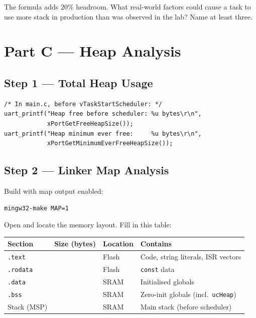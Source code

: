 \documentclass[11pt, a4paper]{article}
\begin{document}
\begin{questionbox}[~B2]
  The formula adds 20\% headroom. What real-world factors could cause a task to use more
  stack in production than was observed in the lab? Name at least three.
\end{questionbox}

\section{Part C --- Heap Analysis}

\subsection{Step 1 --- Total Heap Usage}

\begin{lstlisting}[style=cstyle]
/* In main.c, before vTaskStartScheduler: */
uart_printf("Heap free before scheduler: %u bytes\r\n",
            xPortGetFreeHeapSize());
uart_printf("Heap minimum ever free:     %u bytes\r\n",
            xPortGetMinimumEverFreeHeapSize());
\end{lstlisting}

\subsection{Step 2 --- Linker Map Analysis}

Build with map output enabled:

\begin{lstlisting}[style=bashstyle]
mingw32-make MAP=1
\end{lstlisting}

Open  and locate the memory layout. Fill in this table:

\renewcommand{\arraystretch}{1.3}
\begin{tabular}{@{} p{2.5cm} p{2cm} p{1.8cm} p{5.5cm} @{}}
  \toprule
  \textbf{Section} & \textbf{Size (bytes)} & \textbf{Location} & \textbf{Contains} \\
  \midrule
  \texttt{.text}       & & Flash & Code, string literals, ISR vectors \\
  \texttt{.rodata}     & & Flash & \texttt{const} data \\
  \texttt{.data}       & & SRAM  & Initialised globals \\
  \texttt{.bss}        & & SRAM  & Zero-init globals (incl.\ \texttt{ucHeap}) \\
  Stack (MSP)          & & SRAM  & Main stack (before scheduler) \\
  \bottomrule
\end{tabular}
\renewcommand{\arraystretch}{1}
\end{document}
